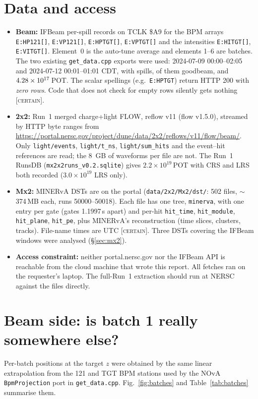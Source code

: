 \documentclass[11pt]{article}
\newcommand{\CERT}{\textsc{[certain]}}
\begin{document}
\section{Data and access}\label{sec:data}
\begin{itemize}
\item \textbf{Beam:} IFBeam per-spill records on TCLK \$A9 for the BPM arrays
\texttt{E:HP121[]}, \texttt{E:VP121[]}, \texttt{E:HPTGT[]}, \texttt{E:VPTGT[]} and the
intensities \texttt{E:HITGT[]}, \texttt{E:VITGT[]}. Element~0 is the auto-tune average and
elements 1--6 are batches. The two existing \texttt{get\_data.cpp} exports were used:
2024-07-09 00:00--02:05 and 2024-07-12 00:01--01:01 CDT, with \NspillTot{} spills,
\NspillGood{} of them goodbeam, and $4.28\times10^{17}$\,POT. The scalar spellings
(e.g.\ \texttt{E:HPTGT}) return HTTP 200 with \emph{zero rows}. Code that does not check
for empty rows silently gets nothing \CERT.
\item \textbf{2x2:} Run~1 merged charge+light FLOW, reflow v11 (flow v1.5.0), streamed by
HTTP byte ranges from \url{https://portal.nersc.gov/project/dune/data/2x2/reflows/v11/flow/beam/}.
Only \texttt{light/events}, \texttt{light/t\_ns}, \texttt{light/sum\_hits} and the event--hit
references are read; the \SI{8}{GB} of waveforms per file are not. The Run~1 RunsDB
(\texttt{mx2x2runs\_v0.2.sqlite}) gives $2.2\times10^{19}$\,POT with CRS and LRS both
recorded ($3.0\times10^{19}$ LRS only).
\item \textbf{Mx2:} MINERvA DSTs are on the portal (\texttt{data/2x2/Mx2/dst/}: 502 files,
$\sim$374\,MB each, runs 50000--50018). Each file has one tree, \texttt{minerva}, with one entry
per gate (gates 1.1997\,s apart) and per-hit \texttt{hit\_time}, \texttt{hit\_module},
\texttt{hit\_plane}, \texttt{hit\_pe}, plus MINERvA's reconstruction (time slices,
clusters, tracks). File-name times are UTC \CERT. Three DSTs covering the IFBeam windows
were analysed (\S\ref{sec:mx2}).
\item \textbf{Access constraint:} neither portal.nersc.gov nor the IFBeam API is reachable
from the cloud machine that wrote this report. All fetches ran on the requester's laptop.
The full-Run~1 extraction should run at NERSC against the files directly.
\end{itemize}

\section{Beam side: is batch 1 really somewhere else?}\label{sec:beam}
Per-batch positions at the target $z$ were obtained by the same linear extrapolation from
the 121 and TGT BPM stations used by the NOvA \texttt{BpmProjection} port in
\texttt{get\_data.cpp}. Fig.~\ref{fig:batches} and Table~\ref{tab:batches} summarise them.
\end{document}

